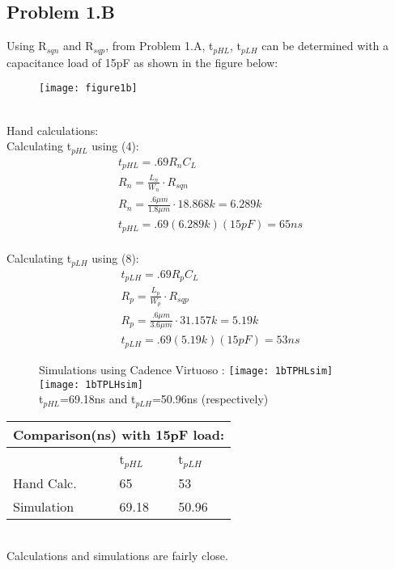 \documentclass{article}
\begin{document}
   \subsection{Problem 1.B}
    Using R$_{sqn}$ and R$_{sqp}$, from Problem 1.A, t$_{pHL}$, t$_{pLH}$ can be determined with a capacitance load of 15pF as shown in the figure below:
   \\
   \begin{figure}[h]
   \centering
   \texttt{[image: figure1b]}
   \end{figure}
   \\
Hand calculations:
\\
Calculating t$_{pHL}$ using (4):
	\begin{gather}	
	t_{pHL}=.69R_{n}C_{L}
	\\
	R_{n}= \frac{L_{n}}{W_{n}}\cdot R_{sqn}
	\\
	R_{n}= \frac{.6\mu m}{1.8\mu m}\cdot 18.868k =6.289k
	\\
	t_{pHL}=.69(6.289k)(15pF)= 65ns
	\end{gather}	
\\
Calculating t$_{pLH}$ using (8):
	\begin{gather}	
	t_{pLH}=.69R_{p}C_{L}
	\\
	R_{p}= \frac{L_{p}}{W_{p}}\cdot R_{sqp}
	\\
	R_{p}= \frac{.6\mu m}{3.6\mu m}\cdot 31.157k =5.19k
	\\
	t_{pLH}=.69(5.19k)(15pF)= 53ns
	\end{gather}
	\newpage	  
\begin{figure}[h]
   \centering
   Simulations using Cadence Virtuoso :
   \texttt{[image: 1bTPHLsim]}\\
   \texttt{[image: 1bTPLHsim]}\\
   t$_{pHL}$=69.18ns and t$_{pLH}$=50.96ns (respectively)
   \end{figure}
\begin{tabular}{ |p{3cm}||p{3cm}|p{3cm}|}
 \hline
 \multicolumn{3}{|c|}{Comparison(ns) with 15pF load:} \\
 \hline
  &t$_{pHL}$ & t$_{pLH}$\\
 \hline
 Hand Calc. & 65 &53 \\
 Simulation  & 69.18 &50.96 \\
 \hline
 \end{tabular}\\
Calculations and simulations are fairly close.
   \newpage
\end{document}
